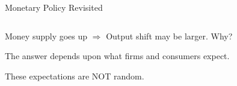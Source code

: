 \documentclass[shownotes,11pt, aspectratio=169]{beamer}
\newenvironment{wideitemize}{\itemize\addtolength{\itemsep}{10pt}}{\enditemize}
\begin{document}
\begin{frame}{Monetary Policy Revisited}
\begin{columns}[T] %
\begin{column}{.52\textwidth}
  \begin{wideitemize}
   \item Money supply goes up $\Rightarrow$ Output shift may be larger. Why?
   \pause
   \item The answer depends upon what firms and consumers expect.     
   \pause
   \item These expectations are NOT random. 
   \end{wideitemize}
\end{column}%
\pause
\hfill%
\begin{column}{.44\textwidth}
\end{column}%
\end{columns}
\end{frame}
\end{document}
